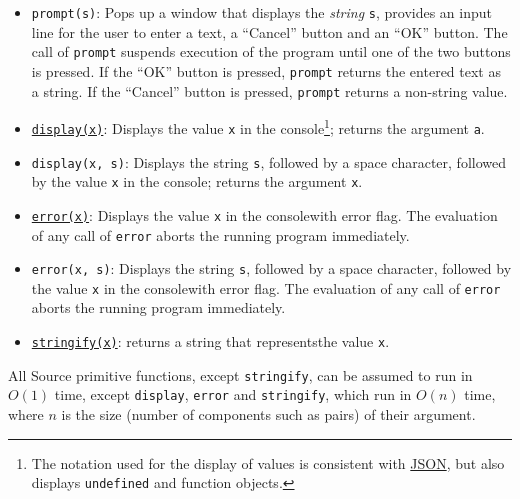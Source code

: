 \begin{itemize}
\item \texttt{prompt(s)}: Pops up a window that displays the \emph{string} \texttt{s}, provides
an input line for the user to enter a text, a ``Cancel'' button and an ``OK'' button. The call of \texttt{prompt}
suspends execution of the program until one of the two buttons is pressed. If 
the ``OK'' button is pressed, \texttt{prompt} returns the entered text as a string.
If the ``Cancel'' button is pressed, \texttt{prompt} returns a non-string value.
\item \href{https://sicp.comp.nus.edu.sg/chapters/17\#footnote-6}{\texttt{display(x)}}: Displays the value \texttt{x} in the console\footnote{The notation used for the display of values is consistent with \href{http://www.ecma-international.org/publications/files/ECMA-ST/ECMA-404.pdf}{\color{DarkBlue}JSON}, but also displays \texttt{undefined} and function objects.}; returns the argument \texttt{a}.
\item \texttt{display(x, s)}: Displays the string \texttt{s}, followed by a space character, followed by the value \texttt{x} in the console\footnotemark[\value{footnote}]; returns the argument \texttt{x}.
\item \href{https://sicp.comp.nus.edu.sg/chapters/21\#footnote-3}{\texttt{error(x)}}: Displays the value \texttt{x} in the console\footnotemark[\value{footnote}] with error flag. The evaluation
  of any call of \texttt{error} aborts the running program immediately.
\item \texttt{error(x, s)}: Displays the string \texttt{s}, followed by a space character, followed by the value \texttt{x} in the console\footnotemark[\value{footnote}] with error flag. The evaluation
  of any call of \texttt{error} aborts the running program immediately.
\item \href{https://sicp.comp.nus.edu.sg/chapters/62}{\lstinline{stringify(x)}}: returns a string that represents\footnotemark[\value{footnote}] the value \texttt{x}. 
\end{itemize}
All Source primitive functions, except \verb#stringify#, can be assumed to run
in $O(1)$ time, except \texttt{display}, \texttt{error} and \texttt{stringify}, 
which run in $O(n)$ time, where $n$ is
the size (number of components such as pairs) of their argument.
